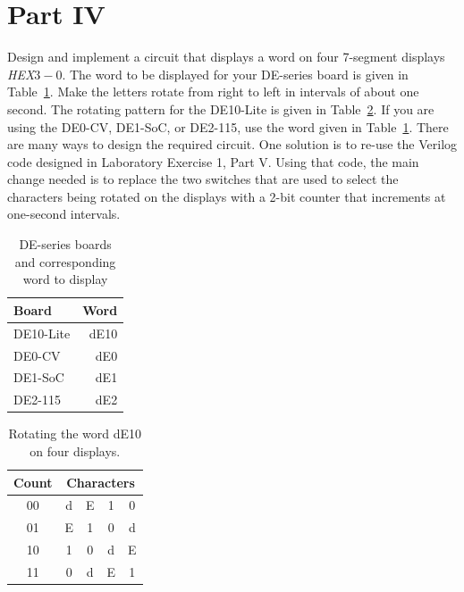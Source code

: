 \documentclass[epsfig,10pt,fullpage]{article}
\begin{document}
\section*{Part IV}
Design and implement a circuit that displays a word on four 7-segment displays {\it HEX}$3-0$.
The word to be displayed for your DE-series board is given in Table~\ref{tab:word}.
Make the letters rotate from right to left in intervals of about one second.
The rotating pattern for the DE10-Lite is given in Table~\ref{tab:rotate}.
If you are using the DE0-CV, DE1-SoC, or DE2-115, use the word given in Table~\ref{tab:word}.
There are many ways to design the required circuit. One solution is to re-use the Verilog code 
designed in Laboratory Exercise 1, Part V. Using that code, the main change needed is to 
replace the two switches that are used to select the characters being rotated on the displays
with a 2-bit counter that increments at one-second intervals.

\begin{table}[H]
\begin{center}
	\begin{tabular}{l | r}
	Board & Word \\
	\hline
	{\rule[0mm]{0mm}{5mm}}DE10-Lite & dE10 \\
	DE0-CV &  dE0 \\
	DE1-SoC &  dE1 \\
	DE2-115 &  dE2 \\
	\end{tabular}
	\caption{DE-series boards and corresponding word to display}
	\label{tab:word}
	\end{center}
\end{table}

\begin{table}[H]
\begin{minipage}[t]{12.5 cm}
\begin{center}
\begin{tabular}{c|cccc}
Count& \multicolumn{4}{c}{Characters} \\
\hline
{\rule[0mm]{0mm}{5mm}00} & d & E & 1 & 0\\ 
01 & E & 1 & 0 & d\\
10 & 1 & 0 & d & E\\
11 & 0 & d & E & 1\\
\end{tabular}
\end{center}
\end{minipage}
\caption{Rotating the word dE10 on four displays.}
\label{tab:rotate}
\end{table}
\end{document}
